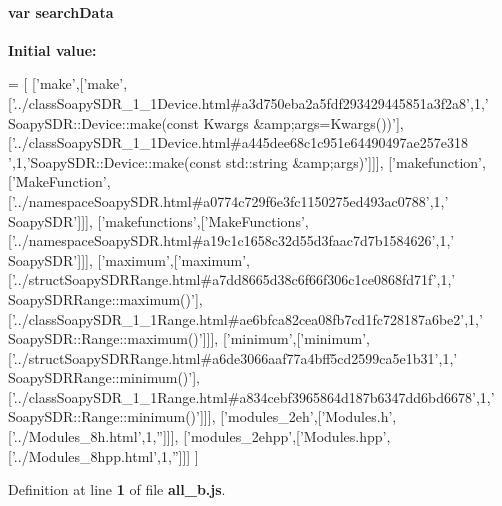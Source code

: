 \paragraph[{search\+Data}]{\setlength{\rightskip}{0pt plus 5cm}var search\+Data}\label{all__b_8js_ad01a7523f103d6242ef9b0451861231e}
{\bfseries Initial value\+:}
\begin{DoxyCode}
=
[
  [\textcolor{stringliteral}{'make'},[\textcolor{stringliteral}{'make'},[\textcolor{stringliteral}{'../classSoapySDR\_1\_1Device.html#a3d750eba2a5fdf293429445851a3f2a8'},1,\textcolor{stringliteral}{'
      SoapySDR::Device::make(const Kwargs &amp;args=Kwargs())'}],[\textcolor{stringliteral}{'../classSoapySDR\_1\_1Device.html#a445dee68c1c951e64490497ae257e318
      '},1,\textcolor{stringliteral}{'SoapySDR::Device::make(const std::string &amp;args)'}]]],
  [\textcolor{stringliteral}{'makefunction'},[\textcolor{stringliteral}{'MakeFunction'},[\textcolor{stringliteral}{'../namespaceSoapySDR.html#a0774c729f6e3fc1150275ed493ac0788'},1,\textcolor{stringliteral}{'
      SoapySDR'}]]],
  [\textcolor{stringliteral}{'makefunctions'},[\textcolor{stringliteral}{'MakeFunctions'},[\textcolor{stringliteral}{'../namespaceSoapySDR.html#a19c1c1658c32d55d3faac7d7b1584626'},1,\textcolor{stringliteral}{'
      SoapySDR'}]]],
  [\textcolor{stringliteral}{'maximum'},[\textcolor{stringliteral}{'maximum'},[\textcolor{stringliteral}{'../structSoapySDRRange.html#a7dd8665d38c6f66f306c1ce0868fd71f'},1,\textcolor{stringliteral}{'
      SoapySDRRange::maximum()'}],[\textcolor{stringliteral}{'../classSoapySDR\_1\_1Range.html#ae6bfca82cea08fb7cd1fc728187a6be2'},1,\textcolor{stringliteral}{'
      SoapySDR::Range::maximum()'}]]],
  [\textcolor{stringliteral}{'minimum'},[\textcolor{stringliteral}{'minimum'},[\textcolor{stringliteral}{'../structSoapySDRRange.html#a6de3066aaf77a4bff5cd2599ca5e1b31'},1,\textcolor{stringliteral}{'
      SoapySDRRange::minimum()'}],[\textcolor{stringliteral}{'../classSoapySDR\_1\_1Range.html#a834cebf3965864d187b6347dd6bd6678'},1,\textcolor{stringliteral}{'
      SoapySDR::Range::minimum()'}]]],
  [\textcolor{stringliteral}{'modules\_2eh'},[\textcolor{stringliteral}{'Modules.h'},[\textcolor{stringliteral}{'../Modules\_8h.html'},1,\textcolor{stringliteral}{''}]]],
  [\textcolor{stringliteral}{'modules\_2ehpp'},[\textcolor{stringliteral}{'Modules.hpp'},[\textcolor{stringliteral}{'../Modules\_8hpp.html'},1,\textcolor{stringliteral}{''}]]]
]
\end{DoxyCode}


Definition at line {\bf 1} of file {\bf all\+\_\+b.\+js}.

